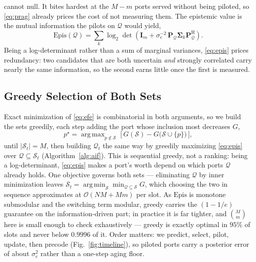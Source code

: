 \documentclass[journal]{IEEEtran}
\newcommand{\bI}{\mathbf{I}}
\newcommand{\bP}{\mathbf{P}}
\newcommand{\bSig}{\boldsymbol{\Sigma}}
\DeclareMathOperator*{\argmin}{arg\,min}
\DeclareMathOperator*{\argmax}{arg\,max}
\begin{document}
cannot null. It bites hardest at the $M-m$ ports served without being piloted,
so \eqref{eq:prag} already prices the cost of not measuring them. The epistemic
value is the mutual information the pilots on $\mathcal{Q}$ would yield,
\begin{equation}
  \mathrm{Epis}(\mathcal{Q}) = \sum_{k}
    \log_2\det\!\left(\bI_{m}
      + \sigma_e^{-2}\,
      \bP_{\mathcal{Q}}\bSig_k\bP_{\mathcal{Q}}^{\mathrm{H}}\right).
  \label{eq:epis}
\end{equation}
Being a log-determinant rather than a sum of marginal variances,
\eqref{eq:epis} prices redundancy: two candidates that are both uncertain
\emph{and} strongly correlated carry nearly the same information, so the second
earns little once the first is measured.



\subsection{Greedy Selection of Both Sets}
Exact minimization of \eqref{eq:efe} is combinatorial in both arguments, so we
build the sets greedily, each step adding the port whose inclusion most
decreases $G$,
\begin{equation}
  p^{\star} = \argmax_{p\notin\mathcal{S}}\;
    \Big[\,G(\mathcal{S}) - G\big(\mathcal{S}\cup\{p\}\big)\,\Big],
  \label{eq:greedy}
\end{equation}
until $|\mathcal{S}_t|=M$, then building $\mathcal{Q}_t$ the same way by
greedily maximizing \eqref{eq:epis} over $\mathcal{Q}\subseteq\mathcal{S}_t$
(Algorithm~\ref{alg:aif}). This is sequential greedy, not a ranking: being a
log-determinant, \eqref{eq:epis} makes a port's worth depend on which ports
$\mathcal{Q}$ already holds. One objective governs both sets --- eliminating
$\mathcal{Q}$ by inner minimization leaves
$\mathcal{S}_t=\argmin_{\mathcal{S}}\min_{\mathcal{Q}\subseteq\mathcal{S}}G$,
which choosing the two in sequence approximates at $\mathcal{O}(NM+Mm)$ per
slot. As $\mathrm{Epis}$ is monotone submodular and the switching term modular,
greedy carries the $(1-1/e)$ guarantee on the information-driven part; in
practice it is far tighter, and $\binom{M}{m}$ here is small enough to check
exhaustively --- greedy is exactly optimal in $95\%$ of slots and never below
$0.9996$ of it. Order matters: we predict, select, pilot, update, then precode
(Fig.~\ref{fig:timeline}), so piloted ports carry a posterior error of about
$\sigma_e^2$ rather than a one-step aging floor.
\end{document}
